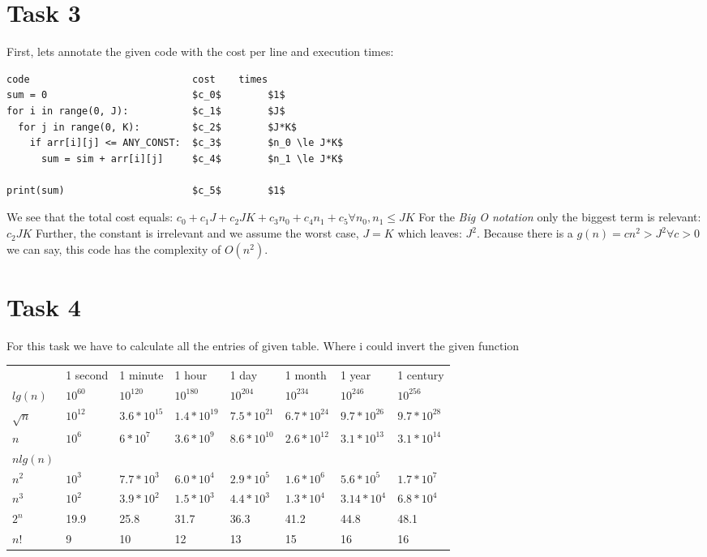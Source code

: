 \documentclass{article}
\begin{document}
\section*{Task 3}

First, lets annotate the given code with the cost per line and execution times:
\begin{lstlisting}
code                            cost    times
sum = 0                         $c_0$        $1$
for i in range(0, J):           $c_1$        $J$
  for j in range(0, K):         $c_2$        $J*K$ 
    if arr[i][j] <= ANY_CONST:  $c_3$        $n_0 \le J*K$ 
      sum = sim + arr[i][j]     $c_4$        $n_1 \le J*K$

print(sum)                      $c_5$        $1$
\end{lstlisting}

We see that the total cost equals: $c_0 + c_1 J + c_2 JK + c_3 n_0 + c_4 n_1 + c_5 \forall n_0, n_1 \le JK$
For the \emph{Big O notation} only the biggest term is relevant: $c_2 JK$
Further, the constant is irrelevant and we assume the worst case, $J=K$ which leaves: $J^2$.
Because there is a $g(n) = cn^2 > J^2 \forall c > 0$ we can say, this code has the complexity of $O(n^2)$.


\section*{Task 4}
For this task we have to calculate all the entries of given table. Where i could invert the given function

\begin{table}[H]
  \begin{tabular}{llllllll}
                       & 1 second & 1 minute & 1 hour & 1 day & 1 month & 1 year & 1 century \\
  $lg(n)$               & $10^{60}$&$10^{120}$&$10^{180}$&$10^{204}$&$10^{234}$&$10^{246}$&$10^{256}$\\
  $\sqrt{n}$           &$10^{12}$ & $3.6*10^{15}$&$1.4*10^{19}$&$7.5*10^{21}$&$6.7*10^{24}$&$9.7*10^{26}$&$9.7*10^{28}$\\
  $n$                  & $10^{6}$&$6*10^{7}$&$3.6*10^{9}$&$8.6* 10^{10}$&$2.6* 10^{12}$&$3.1* 10^{13}$&$3.1* 10^{14}$\\
  $n lg(n)$            & & &        &       &         &        &           \\
  $n^2$                &$10^{3}$  &$7.7*10^{3}$&$6.0*10^{4}$&$2.9*10^{5}$&$1.6*10^{6}$&$5.6*10^{5}$&$1.7*10^{7}$\\
  $n^3$                &$10^{2}$  &$3.9*10^{2}$&$1.5*10^{3}$&$4.4*10^{3}$&$1.3*10^{4}$&$3.14*10^{4}$&$6.8*10^{4}$\\
  $2^n$                &  19.9    & 25.8          & 31.7        &    36.3   & 41.2        & 44.8       & 48.1          \\
  $n!$                 &    9     &     10     &     12   &    13   &      15   &    16    &      16    
  \end{tabular}
  \end{table}
\end{document}
